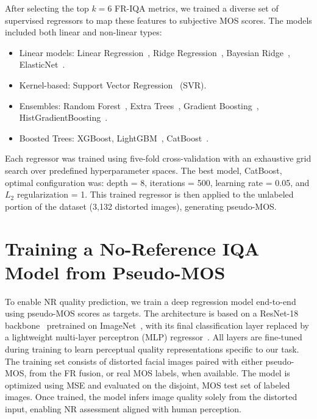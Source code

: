After selecting the top $k = 6$ FR-IQA metrics, we trained a diverse set of supervised regressors to map these features to subjective MOS scores. The models included both linear and non-linear types:

\begin{itemize}
    \item Linear models: Linear Regression~\cite{linearregression}, Ridge Regression~\cite{ridgeregression}, Bayesian Ridge~\cite{bayesianridge}, ElasticNet~\cite{elasticnet}.
    \item Kernel-based: Support Vector Regression~\cite{svr} (SVR).
    \item Ensembles: Random Forest~\cite{randomforest}, Extra Trees~\cite{ensembles}, Gradient Boosting~\cite{gradboosting}, HistGradientBoosting~\cite{histboost}.
    \item Boosted Trees: XGBoost\cite{xgboost}, LightGBM~\cite{lightgbm}, CatBoost~\cite{catboost}.
\end{itemize}

Each regressor was trained using five-fold cross-validation with an exhaustive grid search over predefined hyperparameter spaces. The best model, CatBoost, optimal configuration was: depth = 8, iterations = 500, learning rate = 0.05, and $L_2$ regularization = 1. This trained regressor is then applied to the unlabeled portion of the dataset (3,132 distorted images), generating pseudo-MOS.\@

\section{Training a No-Reference IQA Model from Pseudo-MOS}

To enable NR quality prediction, we train a deep regression model end-to-end using pseudo-MOS scores as targets. The architecture is based on a ResNet-18 backbone~\cite{resnet} pretrained on ImageNet~\cite{imagenet}, with its final classification layer replaced by a lightweight multi-layer perceptron (MLP) regressor~\cite{bayesianridge}. All layers are fine-tuned during training to learn perceptual quality representations specific to our task. The training set consists of distorted facial images paired with either pseudo-MOS, from the FR fusion, or real MOS labels, when available. The model is optimized using MSE and evaluated on the disjoint, MOS test set of labeled images. Once trained, the model infers image quality solely from the distorted input, enabling NR assessment aligned with human perception.

